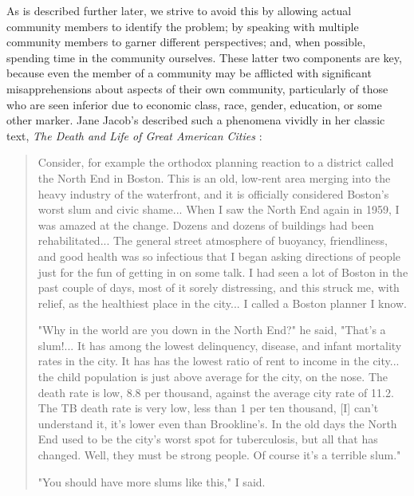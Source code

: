 As is described further later, we strive to avoid this by allowing actual community members to identify the problem; by speaking with multiple community members to garner different perspectives; and, when possible, spending time in the community ourselves. These latter two components are key, because even the member of a community may be afflicted with significant misapprehensions about aspects of their own community, particularly of those who are seen inferior due to economic class, race, gender, education, or some other marker. Jane Jacob's described such a phenomena vividly in her classic text, \textit{The Death and Life of Great American Cities} \cite{jacobsDeathLifeGreat2016}:

\blockquote{Consider, for example the orthodox planning reaction to a district called the North End in Boston. This is an old, low-rent area merging into the heavy industry of the waterfront, and it is officially considered Boston's worst slum and civic shame... When I saw the North End again in 1959, I was amazed at the change. Dozens and dozens of buildings had been rehabilitated... The general street atmosphere of buoyancy, friendliness, and good health was so infectious that I began asking directions of people just for the fun of getting in on some talk. I had seen a lot of Boston in the past couple of days, most of it sorely distressing, and this struck me, with relief, as the healthiest place in the city... I called a Boston planner I know.

"Why in the world are you down in the North End?" he said, "That's a slum!... It has among the lowest delinquency, disease, and infant mortality rates in the city. It has has the lowest ratio of rent to income in the city... the child population is just above average for the city, on the nose. The death rate is low, 8.8 per thousand, against the average city rate of 11.2. The TB death rate is very low, less than 1 per ten thousand, [I] can't understand it, it's lower even than Brookline's. In the old days the North End used to be the city's worst spot for tuberculosis, but all that has changed. Well, they must be strong people. Of course it's a terrible slum."

"You should have more slums like this," I said.} 


\section{}

